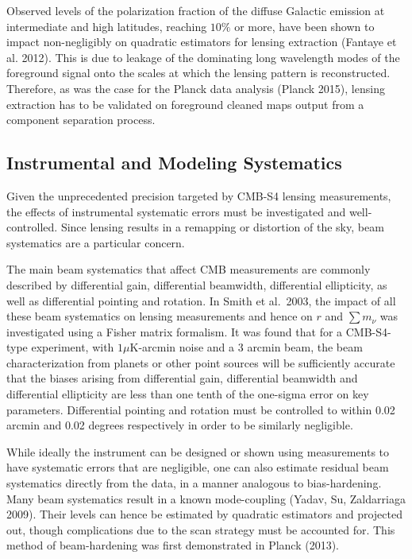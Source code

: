 \documentclass{tcibook}
\begin{document}
Observed levels of the polarization fraction of the diffuse Galactic emission at intermediate and high latitudes, reaching $10\%$ or more, 
have been shown to impact non-negligibly on quadratic estimators for lensing extraction (Fantaye et al. 2012). %
This is due to leakage of the dominating long wavelength modes of the foreground signal onto the scales at which the lensing pattern is reconstructed. 
Therefore, as was the case for the Planck data analysis %
(Planck 2015), lensing extraction has to be validated on foreground cleaned maps output from a component separation process. 

\subsection{Instrumental and Modeling Systematics}\label{systInst}
 	
Given the unprecedented precision targeted by CMB-S4 lensing measurements, the effects of instrumental systematic errors must be investigated and well-controlled. Since lensing results in a remapping or distortion of the sky, beam systematics are a particular concern. 

The main beam systematics that affect CMB measurements are commonly described by differential gain, differential beamwidth, differential ellipticity, as well as differential pointing and rotation. In Smith et al.~2003, the impact of all these beam systematics on lensing measurements and hence on $r$ and $\sum m_\nu$ was investigated using a Fisher matrix formalism. It was found that for a CMB-S4-type experiment, with $1 \mu $K-arcmin noise and a 3 arcmin beam, the beam characterization from planets or other point sources will be sufficiently accurate that the biases arising from differential gain, differential beamwidth and differential ellipticity are less than one tenth of the one-sigma error on key parameters. Differential pointing and rotation must be controlled to within 0.02 arcmin and 0.02 degrees respectively in order to be similarly negligible.

While ideally the instrument can be designed or shown using measurements to have systematic errors that are negligible, one can also estimate residual beam systematics directly from the data, in a manner analogous to bias-hardening. Many beam systematics result in a known mode-coupling (Yadav, Su, Zaldarriaga 2009).  Their levels can hence be estimated by quadratic estimators and projected out, though complications due to the scan strategy must be accounted for. This method of beam-hardening was first demonstrated in Planck (2013).
\end{document}
